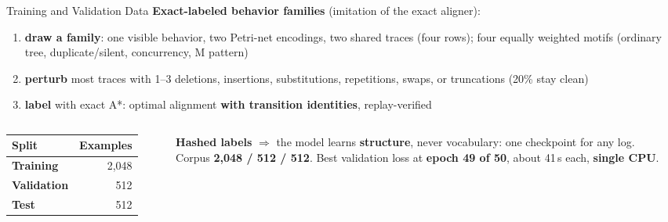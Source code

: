 \documentclass[aspectratio=169]{beamer}
\newcommand{\keyc}[1]{\textbf{\textcolor{larablue}{#1}}}
\newcommand{\keyg}[1]{\textbf{\textcolor{laraaqua!70!black}{#1}}}
\begin{document}
\begin{frame}{Training and Validation Data}
  \textbf{Exact-labeled behavior families} (imitation of the exact aligner):
  \vspace{2mm}
  \begin{enumerate}\setlength{\itemsep}{5pt}
    \item \keyc{draw a family}: one visible behavior, two Petri-net encodings,
      two shared traces (four rows); four equally weighted motifs
      (ordinary tree, duplicate/silent, concurrency, M pattern)
    \item \keyc{perturb} most traces with 1--3 deletions, insertions,
      substitutions, repetitions, swaps, or truncations (20\% stay clean)
    \item \keyc{label} with exact A*: optimal alignment \keyg{with transition identities},
      replay-verified
  \end{enumerate}
  \vspace{3mm}
  \begin{columns}[T]
  \begin{column}{0.5\textwidth}
    \begin{center}
    \begin{tabular}{lr}
      \toprule
      Split & Examples \\
      \midrule
      \keyc{Training} & 2,048 \\
      \keyc{Validation} & 512 \\
      \keyc{Test} & 512 \\
      \bottomrule
    \end{tabular}
    \end{center}
  \end{column}
  \begin{column}{0.46\textwidth}
    \small
    \keyc{Hashed labels} $\Rightarrow$ the model learns \keyg{structure},
    never vocabulary: one checkpoint for any log.\\[2mm]
    Corpus \keyc{2,048 / 512 / 512}. Best validation loss at
    \keyc{epoch 49 of 50}, about 41\,s each, \keyc{single CPU}.
  \end{column}
\end{columns}
\end{frame}
\end{document}
